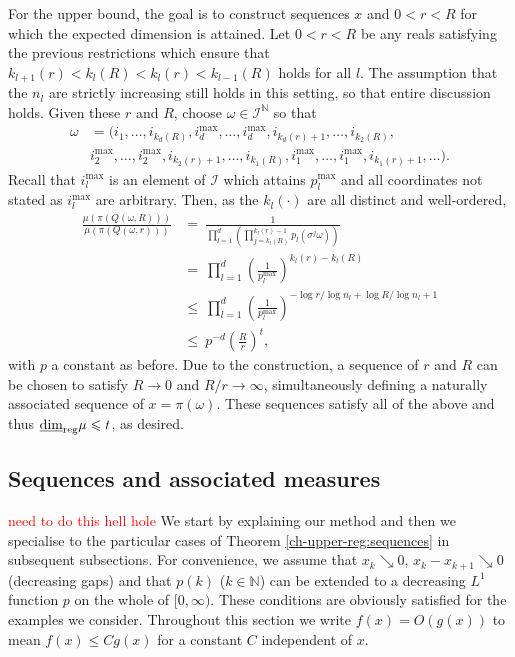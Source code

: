 For the upper bound, the goal is to construct sequences $x$ and $0 < r < R$ for which the expected dimension is attained. Let $0<r<R$ be any reals satisfying the previous restrictions which ensure that $ k_{l+1}(r)< k_l(R) < k_l(r) < k_{l-1}(R)$ holds for all $l$. The assumption that the $n_l$ are strictly increasing still holds in this setting, so that entire discussion holds. Given these $r$ and $R$, choose $\omega \in \mathcal{I}^\mathbb{N}$ so that 
\begin{align*} 
\omega&= (i_1,\ldots, i_{k_d(R)}, i_d^{\text{max}},\ldots, i_d^{\text{max}}, i_{k_d(r)+1},\ldots, i_{k_2(R)},\\
&i_2^{\text{max}},\ldots , i_2^{\text{max}}, i_{k_2(r)+1},\ldots, i_{k_1(R)}, i_1^{\text{max}}, \ldots, i_1^{\text{max}}, i_{k_1(r)+1},\ldots).
\end{align*}
Recall that $i_l^{\text{max}}$ is an element of $\mathcal{I}$ which attains $p_l^{\text{max}}$ and all coordinates not stated as $i_l^{\text{max}}$ are arbitrary. Then, as the $k_l(\cdot)$ are all distinct and well-ordered,
\begin{align*}
\frac{\mu(\pi(Q(\omega,R)))}{\mu(\pi(Q(\omega,r)))}  & =\ \frac{1}{\prod_{l=1}^d\left(\prod_{j=k_l(R)}^{k_l(r)-1}p_l(\sigma^j \omega) \right)} \\
& = \ \prod_{l=1}^d\left( \frac{1}{p_l^{\text{max}}}\right)^{k_l(r)-k_l(R)}  \\
& \le\ \prod_{l=1}^d \left( \frac{1}{p_l^{\text{max}}}\right)^{-\log r/\log n_l + \log R/\log n_l + 1}  \\
& \le \ p^{-d} \left( \frac{R}{r} \right)^{t},
\end{align*}
with $p$ a constant as before. Due to the construction, a sequence of $r$ and $R$ can be chosen to satisfy $R \rightarrow 0$ and $R/r \rightarrow \infty$, simultaneously defining a naturally associated sequence of $x = \pi(\omega)$. These sequences satisfy all of the above and thus $\underline{\dim}_{\textup{reg}} \mu \leqslant t$, as desired.




\subsection{Sequences and associated measures}\label{ch-upper-reg:sequenceproof}

\textcolor{red}{need to do this hell hole}
We start by explaining our method and then we specialise to the particular cases of  Theorem \ref{ch-upper-reg:sequences} in subsequent subsections.  For convenience, we assume that $x_k \searrow 0$, $x_k-x_{k+1} \searrow 0$ (decreasing gaps) and that $p(k)$ ($k \in \mathbb{N}$) can be extended to a decreasing $L^1$ function $p$ on the whole of $[0,\infty)$.  These conditions are obviously satisfied for the  examples we consider.  Throughout this section we write $f(x)=O(g(x))$ to mean $f(x) \le Cg(x)$ for a constant $C$ independent of $x$.

